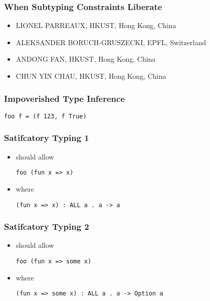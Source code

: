 \documentclass{beamer}
\begin{document}

\begin{frame}
  \frametitle{When Subtyping Constraints Liberate}

  \begin{itemize}
  \item LIONEL PARREAUX, HKUST, Hong Kong, China
  \item ALEKSANDER BORUCH-GRUSZECKI, EPFL, Switzerland
  \item ANDONG FAN, HKUST, Hong Kong, China
  \item CHUN YIN CHAU, HKUST, Hong Kong, China
  \end{itemize}
\end{frame}

\begin{frame}[fragile]
  \frametitle{Impoverished Type Inference}

  \begin{lstlisting}
foo f = (f 123, f True)
  \end{lstlisting}

\end{frame}


\begin{frame}[fragile]
  \frametitle{Satifcatory Typing 1}

  \begin{itemize}
  \item should allow
  \begin{lstlisting}
foo (fun x => x)
  \end{lstlisting}
  \item where
  \begin{lstlisting}
(fun x => x) : ALL a . a -> a
  \end{lstlisting}
  \end{itemize}

\end{frame}


\begin{frame}[fragile]
  \frametitle{Satifcatory Typing 2}

  \begin{itemize}
  \item should allow
  \begin{lstlisting}
foo (fun x => some x)
  \end{lstlisting}
  \item where
  \begin{lstlisting}
(fun x => some x) : ALL a . a -> Option a
  \end{lstlisting}
  \end{itemize}

\end{frame}
\end{document}
